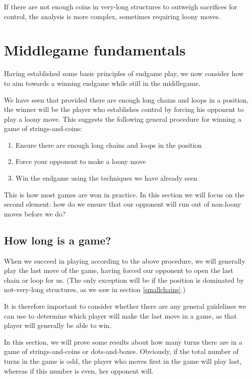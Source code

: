 \documentclass[a4paper,twocolumn]{article}
\begin{document}
If there are not enough coins in very-long structures to outweigh
sacrifices for control, the analysis is more complex, sometimes
requiring loony moves.

\section{Middlegame fundamentals}

Having established some basic principles of endgame play, we now
consider how to aim towards a winning endgame while still in the
middlegame.

We have seen that provided there are enough long chains and loops in
a position, the winner will be the player who establishes control by
forcing his opponent to play a loony move. This suggests the following
general procedure for winning a game of strings-and-coins:

\begin{enumerate}
  \item Ensure there are enough long chains and loops in the position
  \item Force your opponent to make a loony move
  \item Win the endgame using the techniques we have already seen
\end{enumerate}

This is how most games are won in practice. In this section we will focus
on the second element: how do we ensure that our opponent will run out of
non-loony moves before we do?

\subsection{How long is a game?}

When we succeed in playing according to the above procedure, we will
generally play the last move of the game, having forced our opponent to
open the last chain or loop for us. (The only exception will be if the
position is dominated by not-very-long structures, as we saw in section
\ref{smallchains}.)

It is therefore important to consider whether there are any general
guidelines we can use to determine which player will make the last
move in a game, as that player will generally be able to win.

In this section, we will prove some results about how many turns there
are in a game of strings-and-coins or dots-and-boxes. Obviously, if
the total number of turns in the game is odd, the player who moves
first in the game will play last, whereas if this number is even, her
opponent will.
\end{document}
